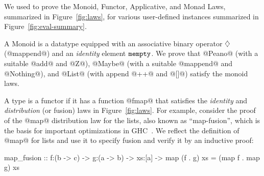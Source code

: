 We used \toolname to prove the Monoid, Functor,
Applicative, and Monad Laws, summarized in
Figure~\ref{fig:laws}, for various user-defined
instances summarized in Figure~\ref{fig:eval-summary}.


%
A Monoid is a datatype equipped with an associative
binary operator $\diamondsuit$ (@mappend@) and an \emph{identity}
element $\texttt{mempty}$.
%
We prove that
%
@Peano@ (with a suitable @add@ and @Z@),
@Maybe@ (with a suitable @mappend@ and @Nothing@), and
@List@ (with append @++@ and @[]@) satisfy the monoid laws.
%

%
A type is a functor if it has a function
@fmap@ that satisfies the \emph{identity}
and \emph{distribution} (or fusion) laws
in Figure~\ref{fig:laws}.
%
For example, consider the proof of
the @map@ distribution law for the lists,
also known as ``map-fusion'', which is the
basis for important optimizations in
GHC~\cite{ghc-map-fusion}.
%
We reflect the definition of @map@ for lists
%
%
and use it to specify fusion and verify it by an inductive proof:
%
\begin{mcode}
  map_fusion :: f:(b -> c) -> g:(a -> b) -> xs:[a] -> {map (f . g) xs = (map f . map g) xs}
\end{mcode}

